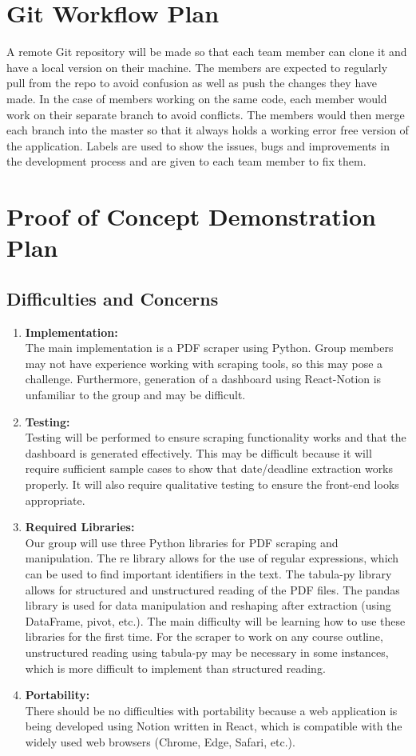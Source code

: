 \documentclass[12pt, titlepage]{article}
\begin{document}
\newpage
\section{Git Workflow Plan}
A remote Git repository will be made so that each team member can clone it and have a local version on their machine. The members are expected to regularly pull from the repo to avoid confusion as well as push the changes they have made. In the case of members working on the same code, each member would work on their separate branch to avoid conflicts. The members would then merge each branch into the master so that it always holds a working error free version of the application. Labels are used to show the issues, bugs and improvements in the development process and are given to each team member to fix them. 

\section{Proof of Concept Demonstration Plan}

\subsection{Difficulties and Concerns}
\begin{enumerate}
  \item \textbf{Implementation:}\\
The main implementation is a PDF scraper using Python. Group members may not have experience working with scraping tools, so this may pose a challenge. Furthermore, generation of a dashboard using React-Notion is unfamiliar to the group and may be difficult. 
  \item \textbf{Testing:}\\
Testing will be performed to ensure scraping functionality works and that the dashboard is generated effectively. This may be difficult because it will require sufficient sample cases to show that date/deadline extraction works properly. It will also require qualitative testing to ensure the front-end looks appropriate. 
  \item \textbf{Required Libraries:}\\
Our group will use three Python libraries for PDF scraping and manipulation. The re library allows for the use of regular expressions, which can be used to find important identifiers in the text. The tabula-py library allows for structured and unstructured reading of the PDF files. The pandas library is used for data manipulation and reshaping after extraction (using DataFrame, pivot, etc.). The main difficulty will be learning how to use these libraries for the first time. For the scraper to work on any course outline, unstructured reading using tabula-py may be necessary in some instances, which is more difficult to implement than structured reading.
  \item \textbf{Portability:}\\
There should be no difficulties with portability because a web application is being developed using Notion written in React, which is compatible with the widely used web browsers (Chrome, Edge, Safari, etc.). 
\end{enumerate}
\end{document}
